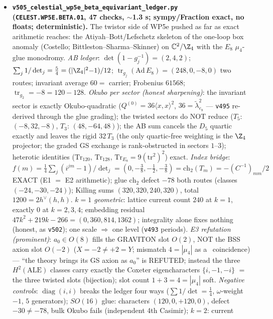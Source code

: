 \documentclass[11pt]{article}
\begin{document}
\begin{itemize}[leftmargin=1.5em]
\item \textbf{\texttt{v505\_celestial\_wp5e\_beta\_equivariant\_ledger.py} (\texttt{CELEST.WP5E.BETA.01},
47 checks, $\sim$1.3 s; sympy/Fraction exact, no floats; deterministic).} The twistor side of WP5e
pushed as far as exact arithmetic reaches: the Atiyah--Bott/Lefschetz skeleton of the one-loop box
anomaly (Costello; Bittleston--Sharma--Skinner) on $\mathbb C^2/\Z_4$ with the $E_8$ $\mu_4$-glue
monodromy. \emph{AB ledger}: $\det(1-g_j^{-1})=(2,4,2)$; $\sum_j1/\det_j=\tfrac54=(|\Z_4|^2{-}1)/12$;
$\operatorname{tr}_{g_j}(\mathrm{Ad}\,E_8)=(248,0,-8,0)$ two routes; invariant average $60=$ carrier;
Frobenius $61568$; $\operatorname{tr}_{g_2}=-8=120-128$. \emph{Okubo per sector (honest
sharpening)}: the invariant sector is exactly Okubo-quadratic ($Q^{(0)}=36\langle x,x\rangle^2$,
$36=\tilde\lambda^2_{e_8}$ --- \texttt{v495} re-derived through the glue grading); the twisted
sectors do NOT reduce ($T_5$: $(-8,32,-8)$, $T_3$: $(48,-64,48)$); the AB sum cancels the $D_5$
quartic exactly and leaves the rigid $32\,T_3$ (the only quartic-free weighting is the $\Z_4$
projector; the graded GS exchange is rank-obstructed in sectors $1$--$3$); heterotic identities
($\mathrm{Tr}_{120}$, $\mathrm{Tr}_{128}$, $\mathrm{Tr}_{E_8}=9(\mathrm{tr}^2)^2$) exact.
\emph{Index bridge}: $f(m)=\tfrac14\sum_j(i^{jm}{-}1)/\det_j=(0,-\tfrac38,-\tfrac12,-\tfrac38)
=\mathrm{ch}_2(T_m)=-(C^{-1})_{mm}/2$ EXACT (E1 $=$ E2 arithmetic); glue $\mathrm{ch}_2$ defect
$-78$ both routes (classes $(-24,-30,-24)$); Killing sums $(320,320,240,320)$, total
$1200=2h^\vee(h,h)$. \emph{$k=1$ geometric}: lattice current count $240$ at $k{=}1$, exactly $0$ at
$k=2,3,4$; embedding residual $47k^2{+}219k{-}266=(0,360,814,1362)$; integrality alone fixes
nothing (honest, as \texttt{v502}); one scale $\Rightarrow$ one level (\texttt{v493} periods).
\emph{E3 refutation (prominent)}: $a_0\in O(8)$ fills the GRAVITON slot $O(2)$, NOT the BSS axion
slot $O(-2)$ ($X=-2\neq+2=Y$; mismatch $4=|\mu_4|$ as a \mC\ coincidence) --- ``the theory brings
its GS axion as $a_0$'' is REFUTED; instead the three $H^2(\mathrm{ALE})$ classes carry exactly the
Coxeter eigencharacters $\{i,-1,-i\}$ $=$ the three twisted slots (bijection); slot count $1{+}3=4
=|\mu_4|$ soft. \emph{Negative controls}: $\operatorname{diag}(i,i)$ breaks the ledger four ways
($\sum1/\det=\tfrac14$, $\omega$-weight $-1$, $5$ generators); $SO(16)$ glue: characters
$(120,0,+120,0)$, defect $-30\neq-78$, bulk Okubo fails (independent 4th Casimir); $k=2$: current

\end{itemize}
\end{document}
